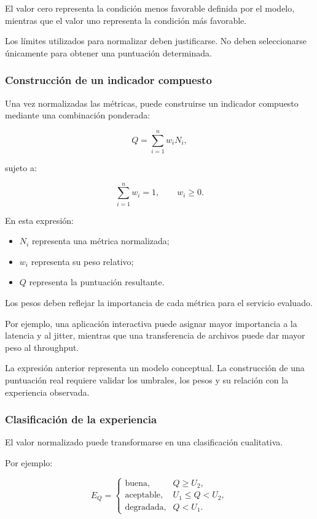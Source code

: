 El valor cero representa la condición menos favorable definida por el
modelo, mientras que el valor uno representa la condición más favorable.

Los límites utilizados para normalizar deben justificarse. No deben
seleccionarse únicamente para obtener una puntuación determinada.


\subsubsection*{Construcción de un indicador compuesto}

Una vez normalizadas las métricas, puede construirse un indicador
compuesto mediante una combinación ponderada:

\[
    Q
    =
    \sum_{i=1}^{n}
    w_i N_i,
\]

sujeto a:

\[
    \sum_{i=1}^{n}
    w_i
    =
    1,
    \qquad
    w_i
    \geq
    0.
\]

En esta expresión:

\begin{itemize}
    \item \(N_i\) representa una métrica normalizada;

    \item \(w_i\) representa su peso relativo;

    \item \(Q\) representa la puntuación resultante.
\end{itemize}

Los pesos deben reflejar la importancia de cada métrica para el servicio
evaluado.

Por ejemplo, una aplicación interactiva puede asignar mayor importancia
a la latencia y al jitter, mientras que una transferencia de archivos
puede dar mayor peso al throughput.

La expresión anterior representa un modelo conceptual. La construcción
de una puntuación real requiere validar los umbrales, los pesos y su
relación con la experiencia observada.


\subsubsection*{Clasificación de la experiencia}

El valor normalizado puede transformarse en una clasificación
cualitativa.

Por ejemplo:

\[
    E_Q
    =
    \begin{cases}
        \text{buena}, &
        Q
        \geq
        U_2,\\
        \text{aceptable}, &
        U_1
        \leq
        Q
        <
        U_2,\\
        \text{degradada}, &
        Q
        <
        U_1.
    \end{cases}
\]

